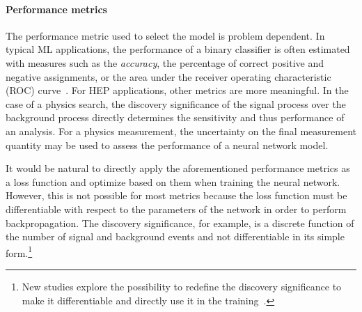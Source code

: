 \paragraph{Performance metrics}

The performance metric used to select the model is problem dependent.
In typical ML applications, the performance of a binary classifier is often estimated with measures such as the \emph{accuracy}, the percentage of correct positive and negative assignments, or the area under the receiver operating characteristic (ROC) curve~\cite{BRADLEY19971145}. 
For HEP applications, other metrics are more meaningful. In the case of a physics search, the discovery significance of the signal process over the background process directly determines the sensitivity and thus performance of an analysis. 
For a physics measurement, the uncertainty on the final measurement quantity may be used to assess the performance of a neural network model.

It would be natural to directly apply the aforementioned performance metrics as a loss function and optimize based on them when training the neural network.
However, this is not possible for most metrics because the loss function must be differentiable with respect to the parameters of the network in order to perform backpropagation. The discovery significance, for example, is a discrete function of the number of signal and background events and not differentiable in its simple form.\footnote{New studies explore the possibility to redefine the discovery significance to make it differentiable and directly use it in the training~\cite{ELWOODZ0INML}.}

